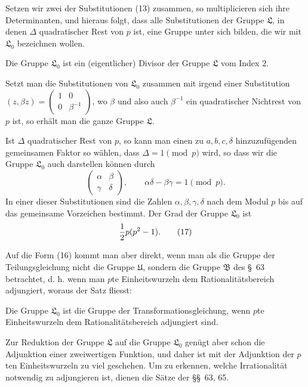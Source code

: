 \documentclass[11pt]{article}
\begin{document}
Setzen wir zwei der Substitutionen (13) zusammen, so multiplicieren sich ihre Determinanten, und hieraus folgt, dass alle Substitutionen der Gruppe $\mathfrak L$, in denen $\Delta$ quadratischer Rest von $p$ ist, eine Gruppe unter sich bilden, die wir mit $\mathfrak L_0$ bezeichnen wollen.

Die Gruppe $\mathfrak L_0$ ist ein (eigentlicher) Divisor der Gruppe $\mathfrak L$ vom Index $2$.

Setzt man die Substitutionen von $\mathfrak L_0$ zusammen mit irgend einer Substitution $(z,\beta z)=\begin{pmatrix}1&0\\ 0&\beta^{-1}\end{pmatrix}$, wo $\beta$ und also auch $\beta^{-1}$ ein quadratischer Nichtrest von $p$ ist, so erhält man die ganze Gruppe $\mathfrak L$.

Ist $\Delta$ quadratischer Rest von $p$, so kann man einen zu $a,b,c,\delta$ hinzuzufügenden gemeinsamen Faktor so wählen, dass $\Delta=1\pmod p$ wird, so dass wir die Gruppe $\mathfrak L_0$ auch darstellen können durch
\begin{equation}
\begin{pmatrix}\alpha&\beta\\ \gamma&\delta\end{pmatrix},
\qquad
\alpha\delta-\beta\gamma=1\pmod p.
\tag{16}
\end{equation}
In einer dieser Substitutionen sind die Zahlen $\alpha,\beta,\gamma,\delta$ nach dem Modul $p$ bis auf das gemeinsame Vorzeichen bestimmt. Der Grad der Gruppe $\mathfrak L_0$ ist
\begin{equation}
 {1\over2}p(p^2-1).
\tag{17}
\end{equation}

Auf die Form (16) kommt man aber direkt, wenn man als die Gruppe der Teilungsgleichung nicht die Gruppe $\mathfrak U$, sondern die Gruppe $\mathfrak B$ des \S~63 betrachtet, d. h. wenn man $p$te Einheitswurzeln dem Rationalitätsbereich adjungiert, woraus der Satz fliesst:

Die Gruppe $\mathfrak L_0$ ist die Gruppe der Transformationsgleichung, wenn $p$te Einheitswurzeln dem Rationalitätsbereich adjungiert sind.

Zur Reduktion der Gruppe $\mathfrak L$ auf die Gruppe $\mathfrak L_0$ genügt aber schon die Adjunktion einer zweiwertigen Funktion, und daher ist mit der Adjunktion der $p$ten Einheitswurzeln zu viel geschehen. Um zu erkennen, welche Irrationalität notwendig zu adjungieren ist, dienen die Sätze der \S\S~63, 65.
\end{document}
